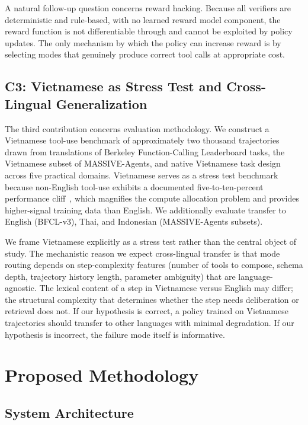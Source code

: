 \documentclass[11pt,a4paper]{article}
\begin{document}
A natural follow-up question concerns reward hacking. Because all verifiers are deterministic and rule-based, with no learned reward model component, the reward function is not differentiable through and cannot be exploited by policy updates. The only mechanism by which the policy can increase reward is by selecting modes that genuinely produce correct tool calls at appropriate cost.

\subsection{C3: Vietnamese as Stress Test and Cross-Lingual Generalization}

The third contribution concerns evaluation methodology. We construct a Vietnamese tool-use benchmark of approximately two thousand trajectories drawn from translations of Berkeley Function-Calling Leaderboard tasks, the Vietnamese subset of MASSIVE-Agents, and native Vietnamese task design across five practical domains. Vietnamese serves as a stress test benchmark because non-English tool-use exhibits a documented five-to-ten-percent performance cliff~\cite{massive_agents, arabic_tool}, which magnifies the compute allocation problem and provides higher-signal training data than English. We additionally evaluate transfer to English (BFCL-v3), Thai, and Indonesian (MASSIVE-Agents subsets).

We frame Vietnamese explicitly as a stress test rather than the central object of study. The mechanistic reason we expect cross-lingual transfer is that mode routing depends on step-complexity features (number of tools to compose, schema depth, trajectory history length, parameter ambiguity) that are language-agnostic. The lexical content of a step in Vietnamese versus English may differ; the structural complexity that determines whether the step needs deliberation or retrieval does not. If our hypothesis is correct, a policy trained on Vietnamese trajectories should transfer to other languages with minimal degradation. If our hypothesis is incorrect, the failure mode itself is informative.

\section{Proposed Methodology}

\subsection{System Architecture}
\end{document}
